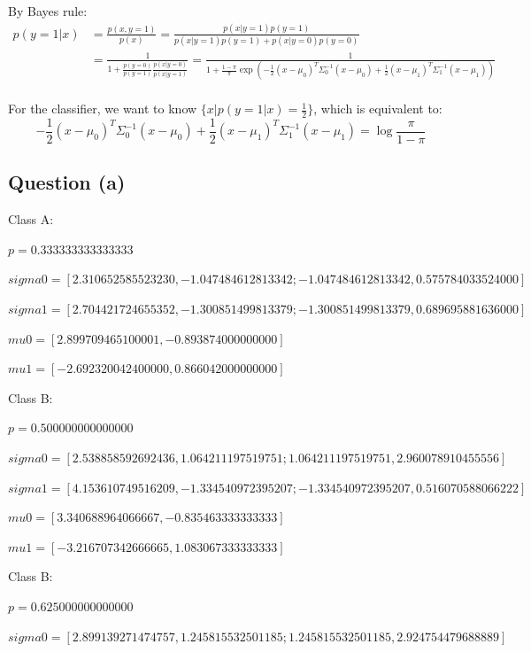 \documentclass{article}
\begin{document}
	By Bayes rule:
	\begin{equation*}
	\begin{split}
	p(y=1|x) &= \frac{p(x,y=1)}{p(x)}=\frac{p(x|y=1)p(y=1)}{p(x|y=1)p(y=1) + p(x|y=0)p(y=0)}\\
	&=\frac{1}{1+\frac{p(y=0)}{p(y=1)} \frac{p(x|y=0)}{p(x|y=1)}} = \frac{1}{1+\frac{1-\pi}{\pi}\exp(- \frac{1}{2} (x-\mu_0)^T \Sigma_0^{-1} (x-\mu_0) + \frac{1}{2} (x-\mu_1)^T \Sigma_1^{-1} (x-\mu_1))}\\
	\end{split}
	\end{equation*}
	
	For the classifier, we want to know $\{x|p(y=1|x)=\frac{1}{2}\}$, which is equivalent to:
	\begin{equation}
	- \frac{1}{2} (x-\mu_0)^T \Sigma_0^{-1} (x-\mu_0) + \frac{1}{2} (x-\mu_1)^T \Sigma_1^{-1} (x-\mu_1) = \log \frac{\pi}{1-\pi}
	\end{equation}
	
	\subsection{Question (a)}
	Class A: 
	
	$p=0.333333333333333$
	
	$sigma0 = [2.310652585523230,-1.047484612813342;-1.047484612813342,0.575784033524000]$
	
	$sigma1 = [2.704421724655352,-1.300851499813379;-1.300851499813379,0.689695881636000]$
	
	$mu0 = [2.899709465100001,-0.893874000000000]$
	
	$mu1 = [-2.692320042400000,0.866042000000000]$
	

	
	Class B: 
	
	$p=0.500000000000000$
	
	$sigma0 = [2.538858592692436,1.064211197519751;1.064211197519751,2.960078910455556]$
	
	$sigma1 = [4.153610749516209,-1.334540972395207;-1.334540972395207,0.516070588066222]$
	
	$mu0 = [3.340688964066667,-0.835463333333333]$
	
	$mu1 = [-3.216707342666665,1.083067333333333]$
	
	Class B: 
	
	$p=0.625000000000000$
	
	$sigma0 = [2.899139271474757,1.245815532501185;1.245815532501185,2.924754479688889]$
	
\end{document}
